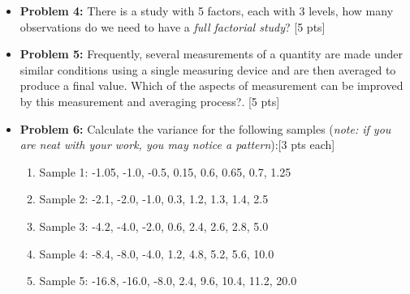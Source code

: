 \documentclass[11pt]{article}\usepackage[]{graphicx}\usepackage[]{color}
\begin{document}
\begin{itemize}
\item \textbf{Problem 4:} There is a study with 5 factors, each with 3 levels, how many observations do we need to have a \textit{ full factorial study}? [5 pts]\\

\item \textbf{Problem 5: }Frequently, several measurements of a quantity are made
	under similar conditions using a single measuring device and are
	then averaged to produce a final value. Which of the aspects of
	measurement  can be improved by this measurement and averaging process?. [5 pts] \\

	
	
	
	


\item \textbf{Problem 6:} Calculate the variance for the following samples (\textit{note: if you are neat with your work, you may notice a pattern}):[3 pts each]
\begin{enumerate}
	\item Sample 1: -1.05, -1.0, -0.5, 0.15, 0.6, 0.65, 0.7, 1.25
	\item Sample 2: -2.1, -2.0, -1.0, 0.3, 1.2, 1.3, 1.4, 2.5
	\item Sample 3: -4.2, -4.0, -2.0, 0.6, 2.4, 2.6, 2.8, 5.0
	\item Sample 4: -8.4, -8.0, -4.0, 1.2, 4.8, 5.2, 5.6, 10.0
	\item Sample 5: -16.8, -16.0, -8.0, 2.4, 9.6, 10.4, 11.2, 20.0
\end{enumerate}




\end{itemize}
\end{document}
